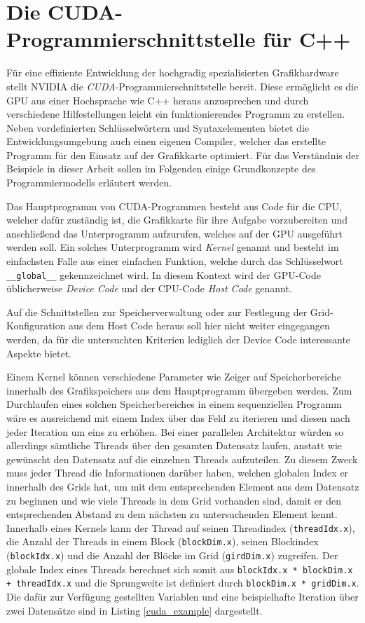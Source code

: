 \section{Die CUDA-Programmierschnittstelle für C++}

Für eine effiziente Entwicklung der hochgradig spezialisierten Grafikhardware stellt NVIDIA die \emph{CUDA}-Programmierschnittstelle bereit.
Diese ermöglicht es die GPU aus einer Hochsprache wie C++ heraus anzusprechen und durch verschiedene Hilfestellungen leicht ein funktionierendes Programm zu erstellen.
Neben vordefinierten Schlüsselwörtern und Syntaxelementen bietet die Entwicklungsumgebung auch einen eigenen Compiler, welcher das erstellte Programm für den Einsatz auf der Grafikkarte optimiert.
Für das Verständnis der Beispiele in dieser Arbeit sollen im Folgenden einige Grundkonzepte des Programmiermodells erläutert werden.

Das Hauptprogramm von CUDA-Programmen besteht aus Code für die CPU, welcher dafür zuständig ist, die Grafikkarte für ihre Aufgabe vorzubereiten und anschließend das Unterprogramm aufzurufen, welches auf der GPU ausgeführt werden soll.
Ein solches Unterprogramm wird \emph{Kernel} genannt und besteht im einfachsten Falle aus einer einfachen Funktion, welche durch das Schlüsselwort \texttt{\_\_global\_\_} gekennzeichnet wird.
In diesem Kontext wird der GPU-Code üblicherweise \emph{Device Code} und der CPU-Code \emph{Host Code} genannt.

Auf die Schnittstellen zur Speicherverwaltung oder zur Festlegung der Grid-Konfiguration aus dem Host Code heraus soll hier nicht weiter eingegangen werden, da für die untersuchten Kriterien lediglich der Device Code interessante Aspekte bietet.

Einem Kernel können verschiedene Parameter wie Zeiger auf Speicherbereiche innerhalb des Grafikspeichers aus dem Hauptprogramm übergeben werden.
Zum Durchlaufen eines solchen Speicherbereiches in einem sequenziellen Programm wäre es ausreichend mit einem Index über das Feld zu iterieren und diesen nach jeder Iteration um eins zu erhöhen.
Bei einer parallelen Architektur würden so allerdings sämtliche Threads über den gesamten Datensatz laufen, anstatt wie gewünscht den Datensatz auf die einzelnen Threads aufzuteilen.
Zu diesem Zweck muss jeder Thread die Informationen darüber haben, welchen globalen Index er innerhalb des Grids hat, um mit dem entsprechenden Element aus dem Datensatz zu beginnen und wie viele Threads in dem Grid vorhanden sind, damit er den entsprechenden Abstand zu dem nächsten zu untersuchenden Element kennt.
Innerhalb eines Kernels kann der Thread auf seinen Threadindex (\texttt{threadIdx.x}), die Anzahl der Threads in einem Block (\texttt{blockDim.x}), seinen Blockindex (\texttt{blockIdx.x}) und die Anzahl der Blöcke im Grid (\texttt{girdDim.x}) zugreifen.
Der globale Index eines Threads berechnet sich somit aus \texttt{blockIdx.x * blockDim.x + threadIdx.x} und die Sprungweite ist definiert durch \texttt{blockDim.x * gridDim.x}.
Die dafür zur Verfügung gestellten Variablen und eine beispielhafte Iteration über zwei Datensätze sind in Listing \ref{cuda_example} dargestellt.

